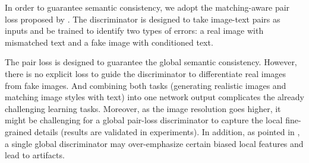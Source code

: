 \documentclass[10pt,twocolumn,letterpaper]{article}
\begin{document}
In order to guarantee semantic consistency, we adopt the matching-aware pair loss proposed by \cite{reed2016generative}. The discriminator is designed to take image-text pairs as inputs and be trained to identify two types of errors: a real image with mismatched text and a fake image with conditioned text.

The pair loss is designed to guarantee the global semantic consistency. However, there is no explicit loss to guide the discriminator to differentiate real images from fake images. And combining both tasks (generating realistic images and matching image styles with text) into one network output complicates the already challenging learning tasks. Moreover, as the image resolution goes higher, it might be challenging for a global pair-loss discriminator to capture the local fine-grained details (results are validated in experiments).
In addition, as pointed in \cite{shrivastava2016learning}, a single global discriminator may over-emphasize certain biased local features and lead to artifacts. 
\end{document}
